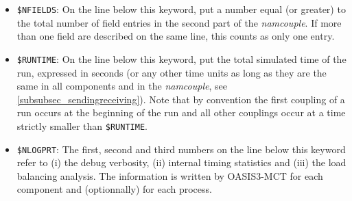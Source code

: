 \begin{itemize}

\item {\tt \$NFIELDS}: On the line below this keyword, put a number equal (or greater) to the total
  number of field entries in the second part of the {\it
    namcouple}. If more than one field are described on the same line, this
  counts as only one entry.

%

\item {\tt \$RUNTIME}: On the line below this keyword, put the total
  simulated time of the run, expressed in seconds (or any other time
  units as long as they are the same in all components and in the {\it
    namcouple}, see \ref{subsubsec_sendingreceiving}). Note that by convention the first coupling of a run occurs at the beginning of the run and all other couplings occur at a time strictly smaller than {\tt \$RUNTIME}.

\item {\tt \$NLOGPRT}: The first, second and third numbers on the line below
  this keyword refer to (i) the debug verbosity, (ii) internal timing statistics
  and (iii) the  load balancing analysis. The information is written by OASIS3-MCT
  for each component and (optionnally) for each process.
  

\end{itemize}
